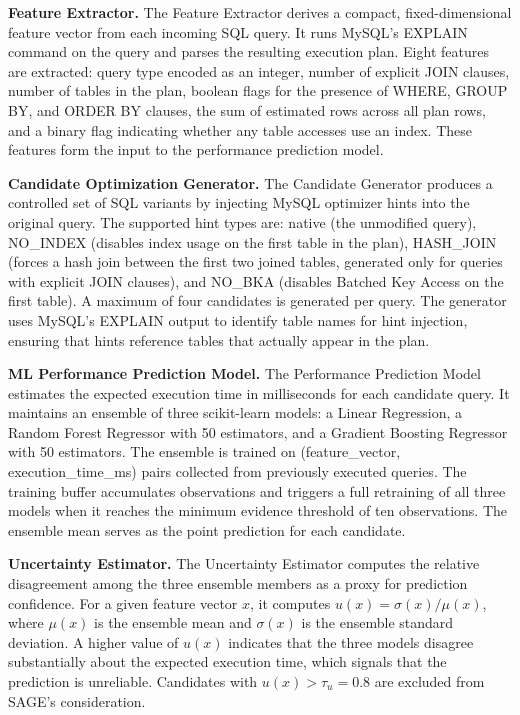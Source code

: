 \textbf{Feature Extractor.} The Feature Extractor derives a compact,
fixed-dimensional feature vector from each incoming SQL query. It runs
MySQL's EXPLAIN command on the query and parses the resulting execution plan.
Eight features are extracted: query type encoded as an integer, number of
explicit JOIN clauses, number of tables in the plan, boolean flags for
the presence of WHERE, GROUP BY, and ORDER BY clauses, the sum of estimated
rows across all plan rows, and a binary flag indicating whether any table
accesses use an index. These features form the input to the performance
prediction model.

\textbf{Candidate Optimization Generator.} The Candidate Generator produces a
controlled set of SQL variants by injecting MySQL optimizer hints into the
original query. The supported hint types are: native (the unmodified query),
NO\_INDEX (disables index usage on the first table in the plan), HASH\_JOIN
(forces a hash join between the first two joined tables, generated only for
queries with explicit JOIN clauses), and NO\_BKA (disables Batched Key Access
on the first table). A maximum of four candidates is generated per query.
The generator uses MySQL's EXPLAIN output to identify table names for hint
injection, ensuring that hints reference tables that actually appear in the
plan.

\textbf{ML Performance Prediction Model.} The Performance Prediction Model
estimates the expected execution time in milliseconds for each candidate
query. It maintains an ensemble of three scikit-learn models: a Linear
Regression, a Random Forest Regressor with 50 estimators, and a Gradient
Boosting Regressor with 50 estimators. The ensemble is trained on
(feature\_vector, execution\_time\_ms) pairs collected from previously
executed queries. The training buffer accumulates observations and triggers
a full retraining of all three models when it reaches the minimum evidence
threshold of ten observations. The ensemble mean serves as the point
prediction for each candidate.

\textbf{Uncertainty Estimator.} The Uncertainty Estimator computes the
relative disagreement among the three ensemble members as a proxy for
prediction confidence. For a given feature vector $x$, it computes
$u(x) = \sigma(x) / \mu(x)$, where $\mu(x)$ is the ensemble mean and
$\sigma(x)$ is the ensemble standard deviation. A higher value of $u(x)$
indicates that the three models disagree substantially about the expected
execution time, which signals that the prediction is unreliable. Candidates
with $u(x) > \tau_u = 0.8$ are excluded from SAGE's consideration.

